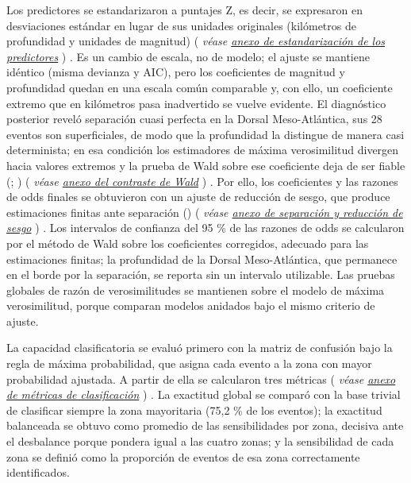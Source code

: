 \documentclass[
  spanish,
  letterpaper,
  DIV=11,
  numbers=noendperiod]{scrartcl}
\newcommand{\asesoriaParenRef}[1]{%
  \textnormal{\textcolor{asesoriaTextColor}{(}}%
  {\hypersetup{linkcolor=asesoriaLinkColor,urlcolor=asesoriaLinkColor,citecolor=asesoriaLinkColor}\textcolor{asesoriaTextColor}{\emph{#1}}}%
  \textnormal{\textcolor{asesoriaTextColor}{)}}%
}
\begin{document}
Los predictores se estandarizaron a puntajes Z, es decir, se expresaron
en desviaciones estándar en lugar de sus unidades originales (kilómetros
de profundidad y unidades de magnitud)
\asesoriaParenRef{véase \hyperref[sec-anexo-estandarizacion]{anexo de estandarización de los predictores}}.
Es un cambio de escala, no de modelo; el ajuste se mantiene idéntico
(misma devianza y AIC), pero los coeficientes de magnitud y profundidad
quedan en una escala común comparable y, con ello, un coeficiente
extremo que en kilómetros pasa inadvertido se vuelve evidente. El
diagnóstico posterior reveló separación cuasi perfecta en la Dorsal
Meso-Atlántica, sus 28 eventos son superficiales, de modo que la
profundidad la distingue de manera casi determinista; en esa condición
los estimadores de máxima verosimilitud divergen hacia valores extremos
y la prueba de Wald sobre ese coeficiente deja de ser fiable
(;
)
\asesoriaParenRef{véase \hyperref[sec-anexo-wald]{anexo del contraste de Wald}}.
Por ello, los coeficientes y las razones de odds finales se obtuvieron
con un ajuste de reducción de sesgo, que produce estimaciones finitas
ante separación ()
\asesoriaParenRef{véase \hyperref[sec-anexo-separacion]{anexo de separación y reducción de sesgo}}.
Los intervalos de confianza del 95 \% de las razones de odds se
calcularon por el método de Wald sobre los coeficientes corregidos,
adecuado para las estimaciones finitas; la profundidad de la Dorsal
Meso-Atlántica, que permanece en el borde por la separación, se reporta
sin un intervalo utilizable. Las pruebas globales de razón de
verosimilitudes se mantienen sobre el modelo de máxima verosimilitud,
porque comparan modelos anidados bajo el mismo criterio de ajuste.

La capacidad clasificatoria se evaluó primero con la matriz de confusión
bajo la regla de máxima probabilidad, que asigna cada evento a la zona
con mayor probabilidad ajustada. A partir de ella se calcularon tres
métricas
\asesoriaParenRef{véase \hyperref[sec-anexo-metricas-clasificacion]{anexo de métricas de clasificación}}.
La exactitud global se comparó con la base trivial de clasificar siempre
la zona mayoritaria (75,2 \% de los eventos); la exactitud balanceada se
obtuvo como promedio de las sensibilidades por zona, decisiva ante el
desbalance porque pondera igual a las cuatro zonas; y la sensibilidad de
cada zona se definió como la proporción de eventos de esa zona
correctamente identificados.
\end{document}
